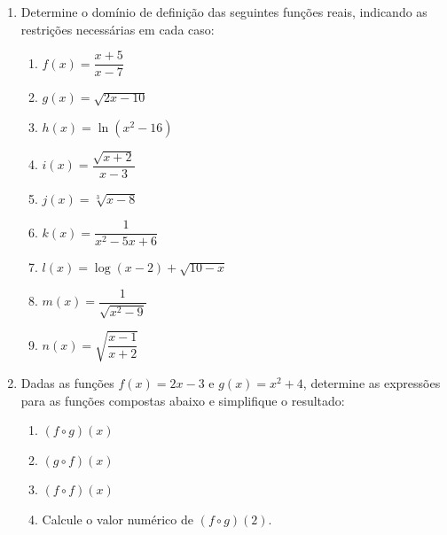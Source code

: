 \documentclass[12pt]{article}
\begin{document}
\begin{enumerate}[label=\arabic*), leftmargin=1.5cm, itemsep=1cm]

    \item Determine o domínio de definição das seguintes funções reais, indicando as restrições necessárias em cada caso:
    \begin{enumerate}[label=\alph*)]
        \item $f(x) = \dfrac{x + 5}{x - 7}$
        \item $g(x) = \sqrt{2x - 10}$
        \item $h(x) = \ln(x^2 - 16)$
        \item $i(x) = \dfrac{\sqrt{x + 2}}{x - 3}$
        \item $j(x) = \sqrt[3]{x - 8}$
        \item $k(x) = \dfrac{1}{x^2 - 5x + 6}$
        \item $l(x) = \log(x - 2) + \sqrt{10 - x}$
        \item $m(x) = \dfrac{1}{\sqrt{x^2 - 9}}$
        \item $n(x) = \sqrt{\dfrac{x-1}{x+2}}$
    \end{enumerate}

    \item Dadas as funções $f(x) = 2x - 3$ e $g(x) = x^2 + 4$, determine as expressões para as funções compostas abaixo e simplifique o resultado:
    \begin{enumerate}[label=\alph*)]
        \item $(f \circ g)(x)$
        \item $(g \circ f)(x)$
        \item $(f \circ f)(x)$
        \item Calcule o valor numérico de $(f \circ g)(2)$.
    \end{enumerate}


\end{enumerate}
\end{document}
